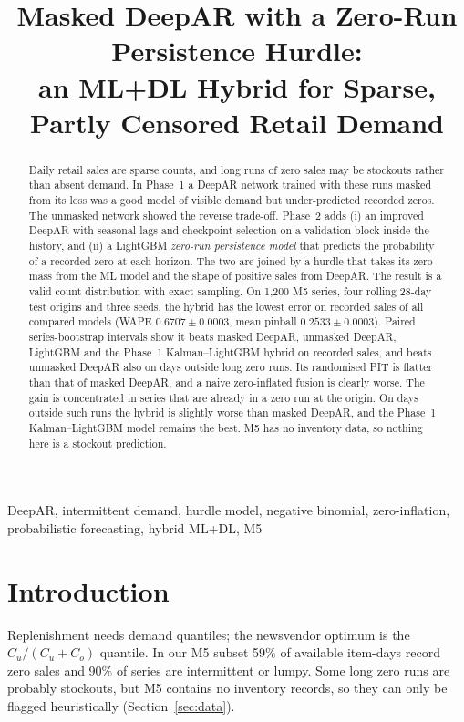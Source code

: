 \documentclass[conference]{IEEEtran}
\begin{document}
\title{Masked DeepAR with a Zero-Run Persistence Hurdle:\\an ML+DL Hybrid for Sparse, Partly Censored Retail Demand}
\author{}
\maketitle

\begin{abstract}
Daily retail sales are sparse counts, and long runs of zero sales may be stockouts rather than absent demand. In Phase~1 a DeepAR network trained with these runs masked from its loss was a good model of visible demand but under-predicted recorded zeros. The unmasked network showed the reverse trade-off. Phase~2 adds (i) an improved DeepAR with seasonal lags and checkpoint selection on a validation block inside the history, and (ii) a LightGBM \emph{zero-run persistence model} that predicts the probability of a recorded zero at each horizon. The two are joined by a hurdle that takes its zero mass from the ML model and the shape of positive sales from DeepAR. The result is a valid count distribution with exact sampling. On 1,200 M5 series, four rolling 28-day test origins and three seeds, the hybrid has the lowest error on recorded sales of all compared models (WAPE $0.6707\pm0.0003$, mean pinball $0.2533\pm0.0003$). Paired series-bootstrap intervals show it beats masked DeepAR, unmasked DeepAR, LightGBM and the Phase~1 Kalman--LightGBM hybrid on recorded sales, and beats unmasked DeepAR also on days outside long zero runs. Its randomised PIT is flatter than that of masked DeepAR, and a naive zero-inflated fusion is clearly worse. The gain is concentrated in series that are already in a zero run at the origin. On days outside such runs the hybrid is slightly worse than masked DeepAR, and the Phase~1 Kalman--LightGBM model remains the best. M5 has no inventory data, so nothing here is a stockout prediction.
\end{abstract}

\begin{IEEEkeywords}
DeepAR, intermittent demand, hurdle model, negative binomial, zero-inflation, probabilistic forecasting, hybrid ML+DL, M5
\end{IEEEkeywords}

\section{Introduction}
Replenishment needs demand quantiles; the newsvendor optimum is the $C_u/(C_u+C_o)$ quantile. In our M5 subset 59\% of available item-days record zero sales and 90\% of series are intermittent or lumpy. Some long zero runs are probably stockouts, but M5 contains no inventory records, so they can only be flagged heuristically (Section~\ref{sec:data}).
\end{document}
